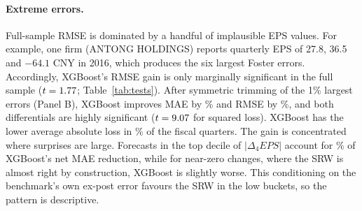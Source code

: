 \documentclass[11pt]{article}
\begin{document}
\begin{table}[!htbp]
\centering\small
\caption{Forecast accuracy. MAE, RMSE and MedAE are in CNY per share. $\%\Delta$ is the improvement relative to the
SRW (positive = better); sMAE scales each absolute error by the firm's historical EPS scale. Panel A uses only
observations with forecasts from all four models. Panel B removes the 1\% of these observations with the largest
absolute error of \emph{any} model. Panel C uses each model's full available sample, without trimming or requiring
forecasts from the other models; its last column reports the observation count $N$, replacing $\%\Delta$sMAE.
Each Panel C improvement compares the model with the SRW evaluated on that model's own sample, so error levels
across rows need not refer to identical observations; Panel A provides the common-sample comparison.
Stars: significance of the mean loss differential,
two-way clustered by firm and fiscal quarter (*** 1\%, ** 5\%, * 10\%).}
\label{tab:overall}
\resizebox{\textwidth}{!}{}
\end{table}

\paragraph{Extreme errors.} Full-sample RMSE is dominated by a handful of implausible EPS values. For example, one
firm (ANTONG HOLDINGS) reports quarterly EPS of 27.8, 36.5 and $-64.1$ CNY in 2016, which produces the six largest
Foster errors. Accordingly, XGBoost's RMSE gain is only marginally significant in the full sample
($t=1.77$; Table~\ref{tab:tests}). After symmetric trimming of the 1\% largest errors (Panel B), XGBoost improves
MAE by \dMAExgbTrim\% and RMSE by \dRMSExgbTrim\%, and both differentials are highly significant ($t=9.07$
for squared loss). XGBoost has the lower average absolute loss in \QbetterMAExgb\% of the \NQuarters{} fiscal
quarters. The gain is concentrated where surprises are large. Forecasts in the top decile of $|\Delta_4 EPS|$ account
for \GainTopTenPctObs\% of XGBoost's net MAE reduction, while for near-zero changes, where the SRW is almost right by
construction, XGBoost is slightly worse. This conditioning on the benchmark's own ex-post error favours the SRW in the
low buckets, so the pattern is descriptive.

\begin{table}[!htbp]
\centering\small
\caption{Paired loss-differential tests, $d=L(e_{SRW})-L(e_m)$ ($d>0$: model beats SRW). $t_{\text{firm, quarter}}$:
two-way clustered; $t_{\text{DM}}$ and $p_{\text{DM}}$: Diebold--Mariano test on quarterly mean differentials
(Newey--West, 4 lags).}
\label{tab:tests}

\end{table}
\end{document}
